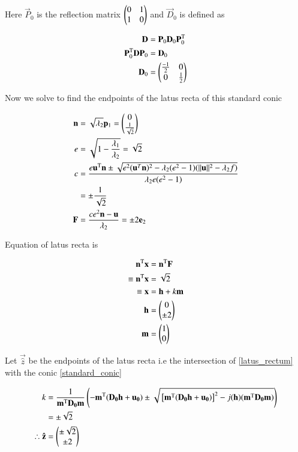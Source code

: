 \documentclass[journal]{IEEEtran}
\begin{document}
Here $\vec{P}_0$ is the reflection matrix $\begin{pmatrix}0 & 1 \\ 1 & 0\end{pmatrix}$ and $\vec{D}_0$ is defined as 

\begin{align}
	\mathbf{D} &= \mathbf{P}_0\mathbf{D}_0\mathbf{P}_0^\text{T}\\
	\mathbf{P}_0^\text{T}\mathbf{D}\mathbf{P}_0 &= \mathbf{D}_0\\
	\mathbf{D}_0 &= \begin{pmatrix}\frac{-1}{2} & 0 \\ 0 & \frac{1}{2}\end{pmatrix}
\end{align}

Now we solve to find the endpoints of the latus recta of this standard conic

\begin{align}
	\mathbf{n} &= \sqrt{\lambda_2}\mathbf{p}_1 = \begin{pmatrix}0 \\ \frac{1}{\sqrt{2}}\end{pmatrix}\\
	e &= \sqrt{1 - \frac{\lambda_1}{\lambda_2}} = \sqrt{2}\\
	c &= \dfrac{e\mathbf{u}^\text{T}\mathbf{n} \pm \sqrt{e^2 (\mathbf{u}^T \mathbf{n})^2 - \lambda_2(e^2 - 1)(\Vert \mathbf{u} \Vert^2-\lambda_2f)}}{\lambda_2e(e^2 - 1)}\\
	&= \pm \frac{1}{\sqrt{2}}\\
	\mathbf{F} &= \dfrac{ce^2\mathbf{n}-\mathbf{u}}{\lambda_2} = \pm 2 \mathbf{e}_2\\
\end{align}

Equation of latus recta is

\begin{align}
	\mathbf{n}^\text{T}\mathbf{x} &= \mathbf{n}^\text{T}\mathbf{F}\\
	\equiv \mathbf{n}^\text{T}\mathbf{x} &= \sqrt{2}\\
	\equiv \mathbf{x} &= \mathbf{h} + k\mathbf{m} \label{latus_rectum}\\
	\mathbf{h} &= \begin{pmatrix}0 \\ \pm 2\end{pmatrix}\\
	\mathbf{m} &= \begin{pmatrix}1 \\ 0\end{pmatrix}
\end{align}

Let $\vec{\hat{z}}$ be the endpoints of the latus recta i.e the intersection of \eqref{latus_rectum} with the conic \eqref{standard_conic}

\begin{align}
	k &= \frac{1}{\mathbf{m}^\text{T}\mathbf{D_0}\mathbf{m}} \left(-\mathbf{m}^\text{T}(\mathbf{D_0h} + \mathbf{u_0}) \pm \sqrt{{}\left[\mathbf{m}^\text{T}(\mathbf{D_0h} + \mathbf{u_0})\right]^2 - j(\mathbf{h}) (\mathbf{m}^\text{T}\mathbf{D_0m})}\right)\\
	&= \pm \sqrt{2}\\
	\therefore \mathbf{\hat{z}} &= \begin{pmatrix}\pm \sqrt{2} \\ \pm 2\end{pmatrix}
\end{align}
\end{document}
